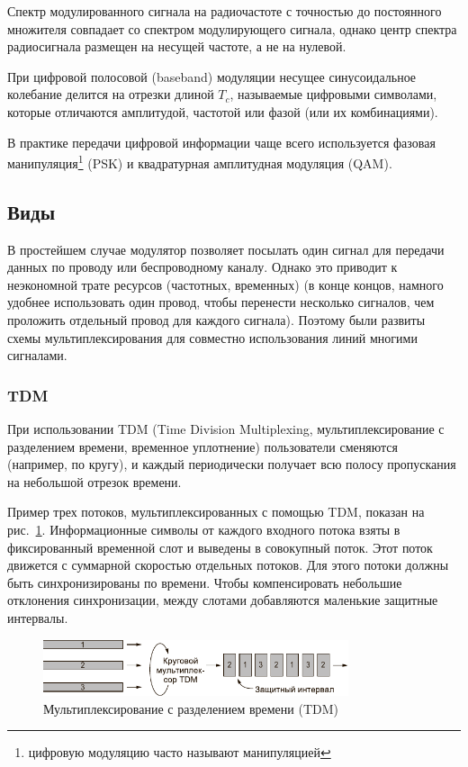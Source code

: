 Спектр модулированного сигнала на радиочастоте с точностью до постоянного множителя совпадает со спектром модулирующего сигнала, однако центр спектра радиосигнала размещен на несущей частоте, а не на нулевой.

При цифровой полосовой (baseband) модуляции несущее синусоидальное колебание делится на отрезки длиной $T_c$, называемые цифровыми символами, которые отличаются амплитудой, частотой или фазой (или их комбинациями).

В практике передачи цифровой информации чаще всего используется фазовая манипуляция\footnote{цифровую модуляцию часто называют манипуляцией} (PSK) и квадратурная амплитудная модуляция (QAM).		





\subsection{Виды}

В простейшем случае модулятор позволяет посылать один сигнал для передачи данных по проводу или беспроводному каналу.
Однако это приводит к неэкономной трате ресурсов (частотных, временных) (в конце концов, намного удобнее использовать один провод, чтобы перенести несколько сигналов, чем проложить отдельный провод для каждого сигнала).
Поэтому были развиты схемы мультиплексирования для совместно использования линий многими сигналами.

\subsubsection{TDM}

При использовании TDM (Time Division Multiplexing, мультиплексирование с разделением времени, временное уплотнение) пользователи сменяются (например, по кругу), и каждый периодически получает всю полосу пропускания на небольшой отрезок времени.

Пример трех потоков, мультиплексированных с помощью TDM, показан на рис.~\ref{tdm}. 
Информационные символы от каждого входного потока взяты в фиксированный временной слот и выведены в совокупный поток.
Этот поток движется с суммарной скоростью отдельных потоков.
Для этого потоки должны быть синхронизированы по времени.
Чтобы компенсировать небольшие отклонения синхронизации, между слотами добавляются маленькие защитные интервалы.

\begin{figure}[h]
\centering
\includegraphics[width = 0.8\textwidth]{tdm.pdf}
\caption{Мультиплексирование с разделением времени (TDM)}
\label{tdm}
\end{figure}


